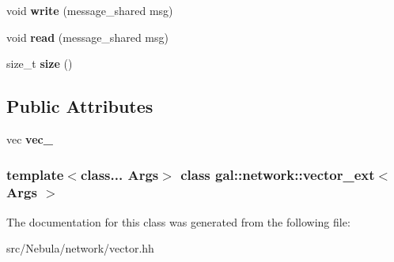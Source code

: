 \begin{DoxyCompactItemize}
\item 
\hypertarget{classgal_1_1network_1_1vector__ext_ab6231dbee5d3773f8e6c6a2099686013}{void {\bfseries write} (message\-\_\-shared msg)}\label{classgal_1_1network_1_1vector__ext_ab6231dbee5d3773f8e6c6a2099686013}

\item 
\hypertarget{classgal_1_1network_1_1vector__ext_aca9774537b3edb25bb1fbb083aba630a}{void {\bfseries read} (message\-\_\-shared msg)}\label{classgal_1_1network_1_1vector__ext_aca9774537b3edb25bb1fbb083aba630a}

\item 
\hypertarget{classgal_1_1network_1_1vector__ext_a3c2f72e7208a18ccea1aa2f0b87985e2}{size\-\_\-t {\bfseries size} ()}\label{classgal_1_1network_1_1vector__ext_a3c2f72e7208a18ccea1aa2f0b87985e2}

\end{DoxyCompactItemize}
\subsection*{\-Public \-Attributes}
\begin{DoxyCompactItemize}
\item 
\hypertarget{classgal_1_1network_1_1vector__ext_ac14af4fb2f11ce5fe177384c10ea9f31}{vec {\bfseries vec\-\_\-}}\label{classgal_1_1network_1_1vector__ext_ac14af4fb2f11ce5fe177384c10ea9f31}

\end{DoxyCompactItemize}
\subsubsection*{template$<$class... \-Args$>$ class gal\-::network\-::vector\-\_\-ext$<$ Args $>$}



\-The documentation for this class was generated from the following file\-:\begin{DoxyCompactItemize}
\item 
src/\-Nebula/network/vector.\-hh\end{DoxyCompactItemize}
